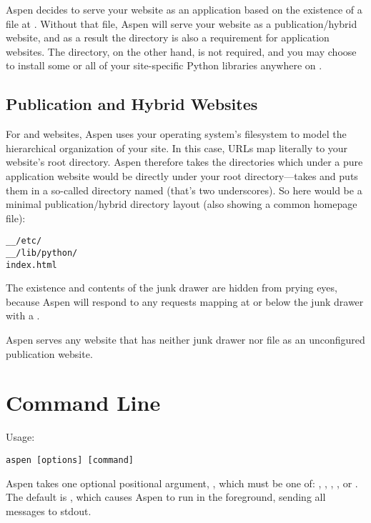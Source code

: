 Aspen decides to serve your website as an application based on the existence of
a file at . Without that file, Aspen will serve your
website as a publication/hybrid website, and as a result the 
directory is also a requirement for application websites.  The 
directory, on the other hand, is not required, and you may choose to install
some or all of your site-specific Python libraries anywhere on
.


\subsection{Publication and Hybrid Websites} \label{directories-pub-hybrid}

For  and  websites, Aspen uses your operating
system's filesystem to model the hierarchical organization of your site. In this
case, URLs map literally to your website's root directory. Aspen therefore takes
the directories which under a pure application website would be directly under
your root directory---takes and puts them in a so-called 
directory named \file{__} (that's two underscores). So here would be a minimal
publication/hybrid directory layout (also showing a common homepage file):

\begin{verbatim}
__/etc/
__/lib/python/
index.html
\end{verbatim}

The existence and contents of the junk drawer are hidden from prying eyes,
because Aspen will respond to any requests mapping at or below the junk drawer
with a .

Aspen serves any website that has neither junk drawer nor 
file as an unconfigured publication website.


\section{Command Line \label{command-line}}

Usage:

\begin{verbatim}
aspen [options] [command]
\end{verbatim}

Aspen takes one optional positional argument, , which must be one
of: , , , , or .
The default is , which causes Aspen to run in the foreground,
sending all messages to stdout.


